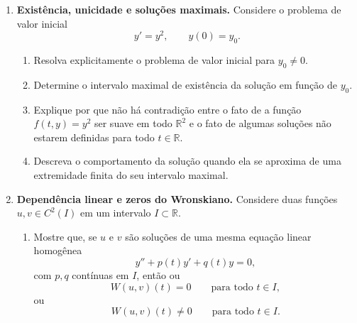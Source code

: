 \documentclass[a4paper,11pt,reqno]{amsart}
\begin{document}
\begin{enumerate}
\begin{enumerate}
    \item Verifique que a equação é exata.

    \item Encontre uma função $F(x,y)$ tal que
    \[
        dF=(2xy+y^2)\,dx+(x^2+2xy)\,dy.
    \]

    \item Encontre a solução implícita do problema de valor inicial
    \[
        (2xy+y^2)\,dx+(x^2+2xy)\,dy=0,
        \qquad
        y(1)=1.
    \]

    \item Determine se é possível escrever a solução explicitamente como $y=y(x)$ em uma vizinhança de $x=1$.
\end{enumerate}


\item \textbf{Existência, unicidade e soluções maximais.}
Considere o problema de valor inicial
\[
    y'=y^2,
    \qquad
    y(0)=y_0.
\]

\begin{enumerate}
    \item Resolva explicitamente o problema de valor inicial para $y_0\neq 0$.

    \item Determine o intervalo maximal de existência da solução em função de $y_0$.

    \item Explique por que não há contradição entre o fato de a função $f(t,y)=y^2$ ser suave em todo $\mathbb{R}^2$ e o fato de algumas soluções não estarem definidas para todo $t\in\mathbb{R}$.

    \item Descreva o comportamento da solução quando ela se aproxima de uma extremidade finita do seu intervalo maximal.
\end{enumerate}


\item \textbf{Dependência linear e zeros do Wronskiano.}
Considere duas funções $u,v\in C^2(I)$ em um intervalo $I\subset\mathbb{R}$.

\begin{enumerate}
    \item Mostre que, se $u$ e $v$ são soluções de uma mesma equação linear homogênea
    \[
        y''+p(t)y'+q(t)y=0,
    \]
    com $p,q$ contínuas em $I$, então ou
    \[
        W(u,v)(t)=0
        \qquad\text{para todo }t\in I,
    \]
    ou
    \[
        W(u,v)(t)\neq 0
        \qquad\text{para todo }t\in I.
    \]


\end{enumerate}
\end{enumerate}
\end{document}
